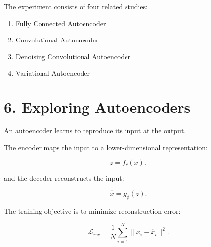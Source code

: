 \documentclass[10pt]{article}
\begin{document}
\begin{center}
\end{center}

The experiment consists of four related studies:

\begin{enumerate}
\item Fully Connected Autoencoder
\item Convolutional Autoencoder
\item Denoising Convolutional Autoencoder
\item Variational Autoencoder
\end{enumerate}

\section*{6. Exploring Autoencoders}

An autoencoder learns to reproduce its input at the output.

The encoder maps the input to a lower-dimensional representation:

\[
z=f_{\theta}(x),
\]

and the decoder reconstructs the input:

\[
\hat{x}=g_{\phi}(z).
\]

The training objective is to minimize reconstruction error:

\[
\mathcal{L}_{rec}
=
\frac{1}{N}\sum_{i=1}^{N}
\|x_i-\hat{x}_i\|^2.
\]

\begin{center}
\end{center}
\end{document}
